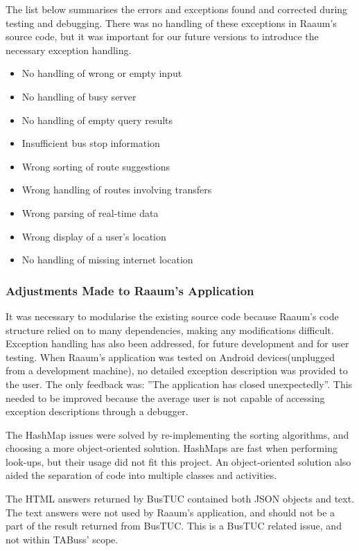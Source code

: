 The list below summarises the errors and exceptions found and corrected during testing and debugging. There was no handling of these exceptions in Raaum's source code, but it was important for our future versions to introduce the necessary exception handling.
\begin{itemize}
\item{No handling of wrong or empty input}
\item{No handling of busy server}
\item{No handling of empty query results }
\item{Insufficient bus stop information}
\item{Wrong sorting of route suggestions}
\item{Wrong handling of routes involving transfers}
\item{Wrong parsing of real-time data}
\item{Wrong display of a user's location}
\item{ No handling of missing internet location}
\end{itemize}



\subsubsection{Adjustments Made to Raaum's Application}
It was necessary to modularise the existing source code because Raaum's code structure relied on to many dependencies, making any modifications difficult. Exception handling has also been addressed, for future development and for user testing. When Raaum's application was tested on Android devices(unplugged from a development machine), no detailed exception description was provided to the user. The only feedback was: ''The application has closed unexpectedly''. This needed to be improved because the average user is not capable of accessing exception descriptions through a debugger.

The HashMap issues were solved by re-implementing the sorting algorithms, and choosing a more object-oriented solution. HashMaps are fast when performing look-ups, but their usage did not fit this project. An object-oriented solution also aided the separation of code into multiple classes and activities. 

The HTML answers returned by BusTUC contained both JSON objects and text. The text answers were not used by Raaum's application, and should not be a part of the result returned from BusTUC. This is a BusTUC related issue, and not within TABuss' scope.

